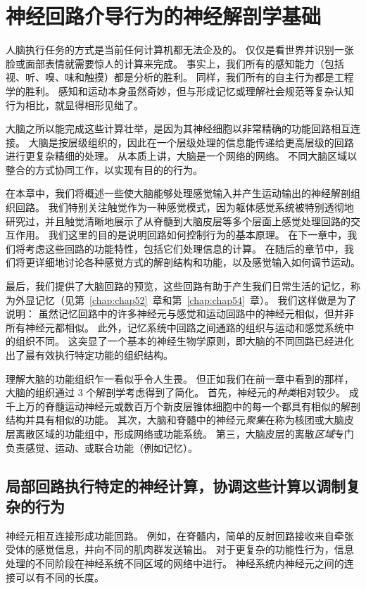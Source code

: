 \chapter{神经回路介导行为的神经解剖学基础} \label{chap:chap4}

人脑执行任务的方式是当前任何计算机都无法企及的。
仅仅是看世界并识别一张脸或面部表情就需要惊人的计算来完成。
事实上，我们所有的感知能力（包括视、听、嗅、味和触摸）都是分析的胜利。
同样，我们所有的自主行为都是工程学的胜利。
感知和运动本身虽然奇妙，但与形成记忆或理解社会规范等复杂认知行为相比，就显得相形见绌了。


大脑之所以能完成这些计算壮举，是因为其神经细胞以非常精确的功能回路相互连接。
大脑是按层级组织的，因此在一个层级处理的信息能传递给更高层级的回路进行更复杂精细的处理。
从本质上讲，大脑是一个网络的网络。
不同大脑区域以整合的方式协同工作，以实现有目的的行为。


在本章中，我们将概述一些使大脑能够处理感觉输入并产生运动输出的神经解剖组织回路。
我们特别关注触觉作为一种感觉模式，因为躯体感觉系统被特别透彻地研究过，并且触觉清晰地展示了从脊髓到大脑皮层等多个层面上感觉处理回路的交互作用。
我们这里的目的是说明回路如何控制行为的基本原理。
在下一章中，我们将考虑这些回路的功能特性，包括它们处理信息的计算。 
在随后的章节中，我们将更详细地讨论各种感觉方式的解剖结构和功能，以及感觉输入如何调节运动。


最后，我们提供了大脑回路的预览，这些回路有助于产生我们日常生活的记忆，称为外显记忆（见第~\ref{chap:chap52}~章和第~\ref{chap:chap54}~章）。
我们这样做是为了说明：
虽然记忆回路中的许多神经元与感觉和运动回路中的神经元相似，但并非所有神经元都相似。
此外，记忆系统中回路之间通路的组织与运动和感觉系统中的组织不同。
这突显了一个基本的神经生物学原则，即大脑的不同回路已经进化出了最有效执行特定功能的组织结构。


理解大脑的功能组织乍一看似乎令人生畏。 
但正如我们在前一章中看到的那样，大脑的组织通过 3 个解剖学考虑得到了简化。
首先，神经元的\textit{种类}相对较少。
成千上万的脊髓运动神经元或数百万个新皮层锥体细胞中的每一个都具有相似的解剖结构并具有相似的功能。 
其次，大脑和脊髓中的神经元\textit{聚集}在称为核团或大脑皮层离散区域的功能组中，形成网络或功能系统。
第三，大脑皮层的离散\textit{区域}专门负责感觉、运动、或联合功能（例如记忆）。


\section{局部回路执行特定的神经计算，协调这些计算以调制复杂的行为}

神经元相互连接形成功能回路。 
例如，在脊髓内，简单的反射回路接收来自牵张受体的感觉信息，并向不同的肌肉群发送输出。
对于更复杂的功能性行为，信息处理的不同阶段在神经系统不同区域的网络中进行。
神经系统内神经元之间的连接可以有不同的长度。


